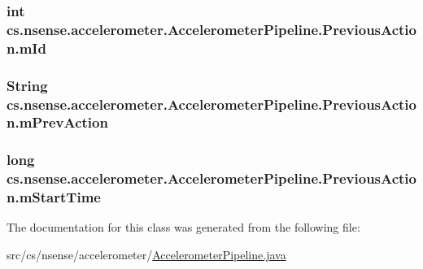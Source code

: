 \hypertarget{classcs_1_1nsense_1_1accelerometer_1_1_accelerometer_pipeline_1_1_previous_action_a6a48100cb4f02e7d2a7b75d32972da4e}{
\subsubsection[{m\-Id}]{\setlength{\rightskip}{0pt plus 5cm}int cs.\-nsense.\-accelerometer.\-Accelerometer\-Pipeline.\-Previous\-Action.\-m\-Id}}\label{classcs_1_1nsense_1_1accelerometer_1_1_accelerometer_pipeline_1_1_previous_action_a6a48100cb4f02e7d2a7b75d32972da4e}
\hypertarget{classcs_1_1nsense_1_1accelerometer_1_1_accelerometer_pipeline_1_1_previous_action_a00517e595a67132cbfe7eb5a77fe6902}{
\subsubsection[{m\-Prev\-Action}]{\setlength{\rightskip}{0pt plus 5cm}String cs.\-nsense.\-accelerometer.\-Accelerometer\-Pipeline.\-Previous\-Action.\-m\-Prev\-Action}}\label{classcs_1_1nsense_1_1accelerometer_1_1_accelerometer_pipeline_1_1_previous_action_a00517e595a67132cbfe7eb5a77fe6902}
\hypertarget{classcs_1_1nsense_1_1accelerometer_1_1_accelerometer_pipeline_1_1_previous_action_af8eeb4d2e92eb3b178c179008c81ac96}{
\subsubsection[{m\-Start\-Time}]{\setlength{\rightskip}{0pt plus 5cm}long cs.\-nsense.\-accelerometer.\-Accelerometer\-Pipeline.\-Previous\-Action.\-m\-Start\-Time}}\label{classcs_1_1nsense_1_1accelerometer_1_1_accelerometer_pipeline_1_1_previous_action_af8eeb4d2e92eb3b178c179008c81ac96}


The documentation for this class was generated from the following file\-:\begin{DoxyCompactItemize}
\item 
src/cs/nsense/accelerometer/\hyperlink{_accelerometer_pipeline_8java}{Accelerometer\-Pipeline.\-java}\end{DoxyCompactItemize}
